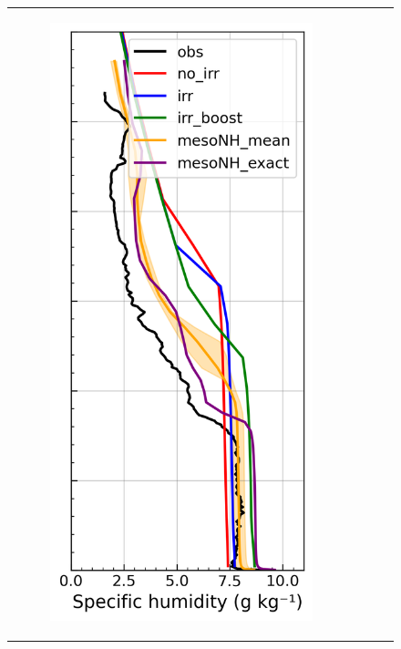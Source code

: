 \begin{figure}[hbtp]
{\begin{tabular}{@{}cccc@{}}
\begin{subfigure}[t]{0.289\textwidth}
            \caption{}
            \includegraphics[width=\textwidth]{images/chap5/profiles/profile_cendrosa_ovap_1507_.png}

\end{subfigure}
\end{tabular}}
\end{figure}
